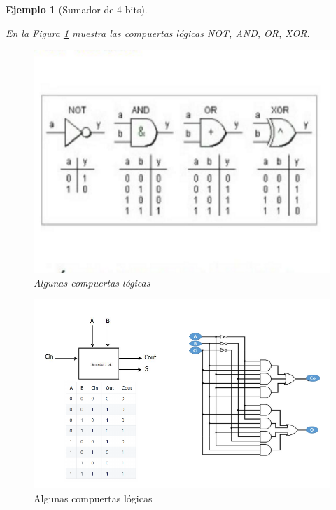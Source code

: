 \documentclass[12pt,letterpaper]{book}
\newtheorem{example}{Ejemplo}
\begin{document}
\begin{example}[Sumador de 4 bits]
\begin{multicols}{2}
En la Figura \ref{ejeSum3} muestra las compuertas lógicas NOT, AND, OR, XOR.

\begin{figure}[H]
\centering
\includegraphics[width=1\linewidth]{figures/ejeSum3.png}
\caption{Algunas compuertas lógicas \cite{Beltran}}
\label{ejeSum3}
\end{figure}
\vspace{0.2cm}
\end{multicols}
\end{example}



\begin{figure}[H]
\centering
\includegraphics[width=1\linewidth]{figures/sum2bits.png}
\caption{Algunas compuertas lógicas \cite{Beltran}}
\label{sum2bits}
\end{figure}
\vspace{0.2cm}
\end{document}
